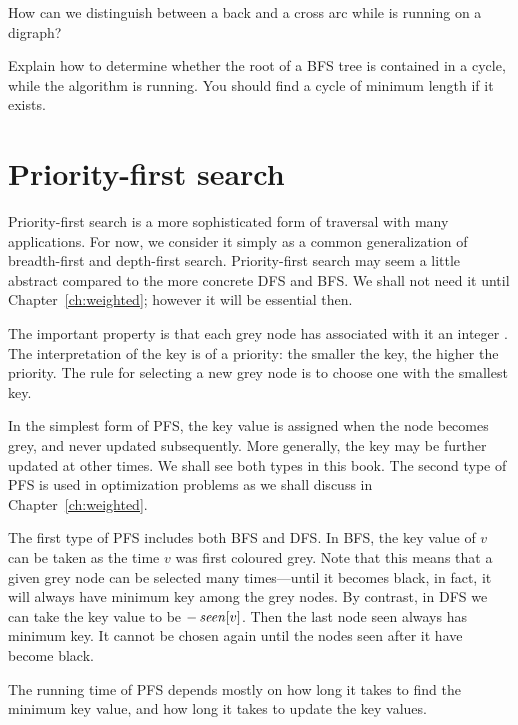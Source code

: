 \begin{Exercise}
\label{ex:BFS-back-vs-cross}
How can we distinguish between a back and a cross arc while 
 is running on a digraph?

\end{Exercise}

\begin{Exercise}
\label{ex:BFS-cycle}
Explain how to determine whether the root of a BFS tree is contained in
a cycle, while the algorithm is running. You should find a cycle of
minimum length if it exists.
\end{Exercise}

\section{Priority-first search}
\label{sec:PFS}

Priority-first search is a more sophisticated form of traversal with
many applications. For now, we consider it simply as a common
generalization of breadth-first and depth-first search. Priority-first
search may seem a little abstract compared to the more concrete DFS and
BFS. We shall not need it until Chapter~\ref{ch:weighted}; however
it will be essential then.

The important property is that each grey node has associated with it an
integer . The interpretation of the key is of a priority: the
smaller the key, the higher the priority. The rule for selecting a new
grey node is to choose one with the smallest key.  

In the simplest form of PFS, the key value is assigned when the node
becomes grey, and never updated subsequently. More generally, the key
may be further updated at other times. We shall see both types in this
book. The second type of PFS is used in optimization problems as we
shall discuss in Chapter~\ref{ch:weighted}. 

The first type of PFS includes both BFS and DFS. In BFS, the key
value of $v$ can be taken as the time $v$ was first coloured grey.
Note that this means that a given grey node can be selected many
times---until it becomes black, in fact, it will always have minimum
key among the grey nodes. By contrast, in DFS we can take the key
value to be $-\operatorname{\text{\textit{seen}}}[v]$. Then the last node seen always has minimum
key. It cannot be chosen again until the nodes seen after it have
become black.

The running time of PFS depends mostly on how long it takes to find the
minimum key value, and how long it takes to update the key values.

